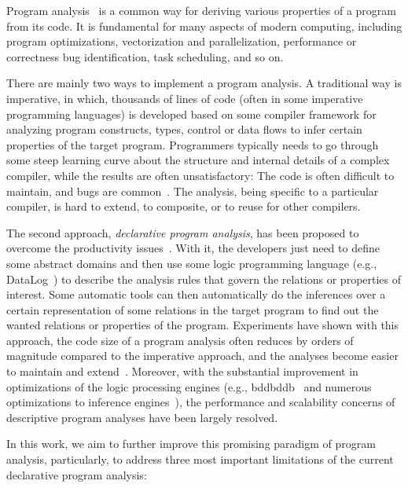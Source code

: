 Program analysis~\cite{nielson2004principles} is a common way for
deriving various properties of a program from its code. It is
fundamental for many aspects of modern computing, including program
optimizations, vectorization and parallelization, performance or
correctness bug identification, task scheduling, and so on.

There are mainly two ways to implement a program analysis.  A
traditional way is imperative, in which, thousands of lines of code
(often in some imperative programming languages) is developed based on
some compiler framework for analyzing program constructs, types,
control or data flows to infer certain properties of the target
program.  Programmers typically needs to go through some steep
learning curve about the structure and internal details of a complex
compiler, while the results are often unsatisfactory: The code is
often difficult to maintain, and bugs are
common~\cite{yang2011finding}. The analysis, being specific to a
particular compiler, is hard to extend, to composite, or to reuse
for other compilers.

The second approach, {\em declarative program analysis}, has been
proposed to overcome the productivity issues~\cite{Ullman_1988,Horwitz_1995,Dawson_1996}. With it, the
developers just need to define some abstract domains and then use some
logic programming language (e.g., DataLog~\cite{whaley_cloning-based_2004}) to describe the
analysis rules that govern the relations or properties of
interest. Some automatic tools can then automatically do the
inferences over a certain representation of some relations in the
target program to find out the wanted relations or properties of the
program. Experiments have shown with this approach, the code size of a
program analysis often reduces by orders of magnitude compared to the
imperative approach, and the analyses become easier to maintain and
extend~\cite{bravenboer_strictly_2009}. Moreover, with the substantial improvement in
optimizations of the logic processing engines (e.g., bddbddb~\cite{whaley2005using}
and numerous optimizations to inference engines~\cite{wielemaker2011}), the
performance and scalability concerns of descriptive program analyses
have been largely resolved. 

In this work, we aim to further improve this promising paradigm of
program analysis, particularly, to address three most important
limitations of the current declarative program analysis:

